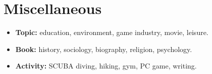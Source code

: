 \documentclass[a4paper, 11pt]{article}
\newcommand{\resumeItem}[2]{
    \item\small{
        \textbf{#1}{#2 \vspace{-2pt}}
    }
}
\newcommand{\resumeItemListStart}{\begin{itemize}[leftmargin=*]\setlength\itemsep{0em}\vspace{-1pt}}
\newcommand{\resumeItemListEnd}{\end{itemize}\vspace{-5pt}}
\begin{document}
    \vspace{-5pt}
    \section{Miscellaneous}

    \resumeItemListStart
    \resumeItem{Topic:}{ education, environment, game industry, movie, leisure.}
    \resumeItem{Book:}{ history, sociology, biography, religion, psychology.}
    \resumeItem{Activity:}{ SCUBA diving, hiking, gym, PC game, writing.}
    \resumeItemListEnd
\end{document}

